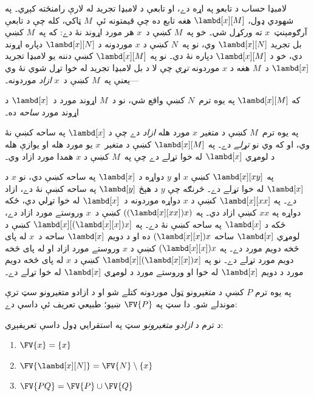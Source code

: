 \documentclass[../../../include/open-logic-section]{subfiles}
\begin{document}

لامبډا حساب د تابعو په اړه دے، او تابعې د لامبډا تجريد له لارې
رامنځته کېږي۔ په شهودي ډول، $\lambd[x][M]$ هغه تابع ده چې قيمتونه
ئې~$M$ ټاکي، کله چې د تابعې آرګومېنټ~$x$ ته ورکړل شي۔ خو په~$M$
کښې د~$x$ هر مورد اړوند نۀ دے: که په~$M$ کښې بل تجريد
$\lambd[x][N]$ وي، نو په~$N$ کښې د $x$ موردونه د
$\lambd[x][N]$ دپاره اړوند دي، خو د $\lambd[x][M]$ دپاره نۀ دي۔
نو په $\lambd[x][M]$ کښې دننه يو لامبډا تجريد $\lambd[x]$ د~$M$
هغه د $x$ موردونه \emph{تړي} چې لا د بل لامبډا تجريد له خوا تړل
شوي نۀ وي---يعنې په~$M$ کښې د~$x$ \emph{ازاد} موردونه۔

\begin{defn}[ساحه]
که $\lambd[x][M]$ په يوه ترم~$N$ کښې واقع شي، نو د~$M$ اړوند
مورد د~$\lambd[x]$ د اړوند مورد \emph{ساحه} ده۔
\end{defn}

\begin{defn}
  په يوه ترم~$M$ کښې د متغير $x$ مورد هله \emph{ازاد} دے چې د
  $\lambd[x]$ په ساحه کښې نۀ وي، او که وي نو \emph{تړلے} دے۔ په
  $\lambd[x][M]$ کښې د متغير~$x$ يو مورد هله او يوازې هله د لومړي
  $\lambd[x]$ له خوا تړلے دے چې په~$M$ کښې د $x$ همدا مورد ازاد وي۔
\end{defn}

\begin{ex}
  په $\lambd[x][x y]$ کښې $x$ او $y$ دواړه د $\lambd[x]$ په
  ساحه کښې دي، نو $x$ د $\lambd[x]$ له خوا تړلے دے۔ څرنګه چې $y$
  د هېڅ $\lambd[y]$ په ساحه کښې نۀ دے، ازاد دے۔ په
  $\lambd[x][x x]$ کښې د $x$ دواړه موردونه د~$\lambd[x]$ له خوا
  تړلي دي، ځکه دواړه په $xx$ کښې ازاد دي۔ په $((\lambd[x][xx])x)$
  کښې د~$x$ وروستے مورد ازاد دے، ځکه د $\lambd[x]$ په ساحه کښې نۀ
  دے۔ په $\lambd[x][(\lambd[x][x])x]$ کښې د لومړي $\lambd[x]$
  ساحه $(\lambd[x][x])x$ ده او د دويم $\lambd[x]$ ساحه د~$x$ له
  پای څخه دويم مورد دے۔ په $(\lambd[x][x])x$ کښې د $x$ وروستے
  مورد ازاد او له پای څخه دويم مورد تړلے دے۔ نو په
  $\lambd[x][(\lambd[x][x])x]$ کښې د $x$ له پای څخه دويم مورد د
  دويم $\lambd[x]$ له خوا او وروستے مورد د لومړي $\lambd[x]$
  له خوا تړلے دے۔
\end{ex}

په يوه ترم $P$ کښې د متغيرونو ټول موردونه کتلے شو او د ازادو
متغيرونو سټ ترې موندلے شو۔ دا سټ په $\FV{P}$ ښيو؛ طبيعي تعريف
ئې داسې دے:

\begin{defn} 
  د ترم د \emph{ازادو متغيرونو} سټ په استقرايي ډول داسې تعريفېږي:
  \begin{enumerate}
    \item $\FV{x} = \{x\}$ 
    \item $\FV{\lambd[x][N]} = \FV{N} \setminus \{x\}$    
    \item $\FV{PQ} = \FV{P} \cup \FV{Q}$ 
  \end{enumerate}
\end{defn}
\end{document}
